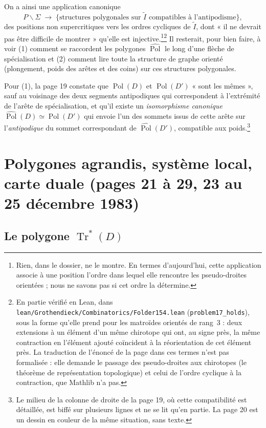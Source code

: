 \documentclass[11pt,a4paper]{article}
\begin{document}
On a ainsi une application canonique
\[
P \smallsetminus \Sigma \;\longrightarrow\; \lbrace \text{structures
polygonales sur } \widetilde{I} \text{ compatibles à l'antipodisme} \rbrace ,
\]
des positions non supercritiques vers les ordres cycliques de $\widetilde{I}$,
dont « il ne devrait pas être difficile de montrer » qu'elle est
injective.\footnote{Rien, dans le dossier, ne le montre. En termes d'aujourd'hui,
cette application associe à une position l'ordre dans lequel elle rencontre les
pseudo-droites orientées ; nous ne savons pas si cet ordre la détermine.}\footnote{En partie vérifié en
Lean, dans \texttt{lean/Grothendieck/Combinatorics/Folder154.lean} (\texttt{problem17\_holds}),
sous la forme qu'elle prend pour les matroïdes orientés de rang~3 : deux
extensions à un élément d'un même chirotope qui ont, au signe près, la même
contraction en l'élément ajouté coïncident à la réorientation de cet élément
près. La traduction de l'énoncé de la page dans ces termes n'est pas formalisée :
elle demande le passage des pseudo-droites aux chirotopes (le théorème de
représentation topologique) et celui de l'ordre cyclique à la contraction, que
Mathlib n'a pas.} Il
resterait, pour bien faire, à voir (1) comment se raccordent les polygones
$\widehat{\operatorname{Pol}}$ le long d'une flèche de spécialisation et (2)
comment lire toute la structure de graphe orienté (plongement, poids des arêtes
et des coins) sur ces structures polygonales.

Pour (1), la page 19 constate que $\operatorname{Pol}(D)$ et
$\operatorname{Pol}(D')$ « sont les mêmes », sauf au voisinage des deux segments
antipodiques qui correspondent à l'extrémité de l'arête de spécialisation, et
qu'il existe un \emph{isomorphisme canonique} $\widehat{\operatorname{Pol}}(D)
\simeq \widehat{\operatorname{Pol}}(D')$ qui envoie l'un des sommets issus de
cette arête sur l'\emph{antipodique} du sommet correspondant de
$\widehat{\operatorname{Pol}}(D')$, compatible aux poids.\footnote{Le milieu de
la colonne de droite de la page 19, où cette compatibilité est détaillée, est
biffé sur plusieurs lignes et ne se lit qu'en partie. La page 20 est un dessin
en couleur de la même situation, sans texte.}

\section*{Polygones agrandis, système local, carte duale (pages 21 à 29, 23 au 25 décembre 1983)}

\subsection*{Le polygone $\operatorname{Tr}^{*}(D)$}
\end{document}
